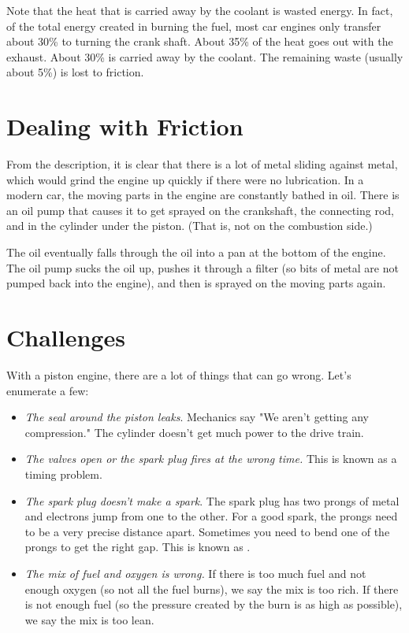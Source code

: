 Note that the heat that is carried away by the coolant is wasted energy.    In fact,  of the total energy created in burning the fuel,  most car engines only transfer about 30\% to turning the crank shaft.  About 35\% of the heat goes out with the exhaust.  About 30\% is carried away by the coolant.  
The remaining waste (usually about  5\%) is lost to friction.

\section{Dealing with Friction}

From the description,  it is clear that there is a lot of metal sliding against metal,  which would grind the engine up quickly if there were no lubrication.  In a modern car, the moving parts in the engine are constantly bathed in oil.  There is an oil pump that causes it to get sprayed on the crankshaft, the connecting rod, and in the cylinder under the piston. (That is, not on the combustion side.)  

The oil eventually falls through the oil into a pan at the bottom of the engine.   The oil pump sucks the oil up,  pushes it through a filter (so bits of metal are not pumped back into the engine),  and then is sprayed on the moving parts again.

\section{Challenges}

With a piston engine, there are a lot of things that can go wrong.  Let's enumerate a few:

\begin{itemize}

\item \textit{The seal around the piston leaks}.  Mechanics say "We aren't getting any compression."  The cylinder doesn't get much power to the drive train.

\item \textit{The valves open or the spark plug fires at the wrong time.}  This is known as a timing problem. 

\item \textit{The spark plug doesn't make a spark}.   The spark plug has two prongs of metal and electrons jump from one to the other.  For a good spark,  the prongs need to be a very precise distance apart.  Sometimes you need to bend one of the prongs to get the right gap.  This is known as .

\item \textit{The mix of fuel and oxygen is wrong.}  If there is too much fuel and not enough oxygen (so not all the fuel burns),  we say the mix is too rich.  If there is not enough fuel (so the pressure created by the burn is as high as possible),   we say the mix is too lean.

\end{itemize}

